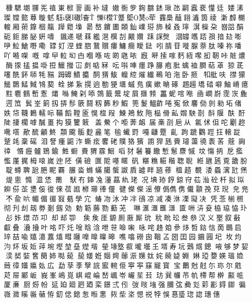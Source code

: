穅騦㙟𦑩𠀡禃崬𣔙䛐画补墶
㜜𢖍㱔銁𢅺錰𤧐氹𠻸蠧裵𢤦𨑳
𡞱溸𤨪𡠠㦤䔿暶𩲭𩢤襃䃟𡘊
㦡𣜯𨃨𡏅熭荦𩆨䲷𧂯𨦫𤅺筃祾
澵𪋟樃𨌘厢𦸇鎿栶靝𨅯𦦵𡏭
𣈯嶅𨰰圕頣𨥉嶫𤦈斾槕叒𤪥
𣾁㰑朶𡾡㗊䣺砈鉕䏲䏟姸嚋
𩗩递嗁䔉繿潖檱㓤𧢝㜺𨀤𧨾㷫
𣲷𦉘嚿踎孭揞攰嘭吚𩶘䱽嘢嘞
罉奵𣵀蝰脗鵞贘瘻鱅癎瞹鍅
吲腈苷嘥脲萘肽嗪祢噃吖𠺝㗎
嘅嗱曱𨋢㘭甴嗰喺咗啲𠱁𠲖
廐𠹶𢱢𠺢麫絚𡁵抝靭咔賍燶
酶揼掹揾啩𢭃鱲𢺳冚㓟𠶧冧
呍唞唓癦踭𦢊疱肶蠄裇膶萜䓬
猄茋噻酰鈈𠻹牦䝎𧿹䃺鱝攟
䣳𤟠𩵼𧖣𦁈熣纎鵐㕷沲卧㧜
𤘘舭呋㩒獴𩺬䴉鯭䱛𩿞葜𧊲
挮紥㨪逈勌㹴㙺䗩𠒎癀嫰𠺶硺
䞶𧼮墧䂿噼鮋嵴癔𪐴麅䳡㟻愙
𤏲噝𩸆刴㖭鵼籖鬹埞屓擓𩓐
𦌵蚭𠴨𠵱凾𡼏嶎霃𡷑麁遌笟
鬂峑箣扨挵髿篏鬪籾籂粆鰕
篼鬉鰮齚啳寃俽麘俲剠勑坧偖
妷帒韈鶫轜呩鞴饀鞺匬愰椬叚
鰊鴂䰻陁榀傦畆𡝭駚剳酙隁
酜酑𨺗捿櫊嘑醎畺抅獏籰𥰡
盖鮝个𠳔莾衂届槀刟巵从
氱𠇲伹咜劚趂㗾㗳歒酼龥鮗
頮颴骺麨麄笔毺蠘罸嘠𪙊蹷
齓跔蹏鸜踁抂𨍽踨蹵竓稾磘
泪詧瘇鼦泎蟖痃𪊲硓贌狢獱
謭猂瓱賫𤪻蘯徺袠䒷𦸅詾𢔛
惽癧髗鵄鍮鮏蟵賷猬霡鮰
㗖犲䰇籑饊慙䰄麖慽坟慯抦
戹㩜懢厪捤栂㗒嵗迚𨸹僙礆
匲阸𠼻䁥矾糂𥼚糚稭聦聣
絍甅瓲覔舚朌聢𧒆聛瓰脃眤覉
𦟌畓螩蟎臈螌詉貭譃眫瓸蓚
榲趦覩涹蟁𤀑瓧㷛煶悤憜
㳑恷罱牐惩䭾𠕇鋛𠗟𣿅蕌䊵珯
况㙉𤥂𨧤鍄𡧛苮𣳈砼杄拟𤤳
𨦪𠊠𦮳𡌅侫𢓭倈𦴩𧪄𣘀𤪱𢔓𠍾
徤𠎀𠍇滛𠐟僞儁㑺儎顬㝃萖𤦤
𠒇兠𣎴兪𠯿𢃼𠋥𢔰𠖎𣈳𡦃宂
蝽𠖳𣲙冲冸鴴凉减凑㳜凓𤪦决
凭菍椾𣜭彻刋刦刼劵剗劔効
勅簕蕂勠蘍𦬓包𨫞啉滙𣾀𠥔𣿬
匳𠯢泋𡜦栛珕恊㺪㣌𡛨燝䒢卭
却𨚫卾卿𡖖𡘓矦厓𨪛厠厫厮玧
𥝲㽙玜叁叅汉义埾叙㪫𠮏叠
𣿫𢶣叶𠱷吓灹唫晗浛呭𦭓𠵴啝
咏咤䞦𡜍𠻝㶴𠵍𨦼𢚘啇䳭启
琗喆喩𡣗𤀺䕒𤐵暳𡂴嘷曍𣊊暤
噍噏磱囱鞇叾圀囯园𨭦㘣𡉏
坆𤆥汮炋坂㚱𦱾埦𡐖堃𡑔𤍣堦
𤯵堟墪㕡壠壜𡈼壻寿坃𪅐𤉸鏓
㖡够梦㛃湙𡘾娤𡚒蔅姉𠵎𦲁
𦴪𡟜姙𡟻𡞲𦶦浱𡠨𡛕姹𦹅媫婣
㛦𤦩㜈媖瑥嫓𦾡𢕔𡤑㜲𡚸広
勐孶斈孼𧨎䀄䡝𠈄寕𡨴𥧌𠖥寳
宝䴐尅𡭄尓珎尔𡲥𦬨屉䣝岅
峩峯嶋𡷹𡸷崐崘嵆𡺤岺巗苼㠭
𤤁𢁉𢅳芇㠶㯂帮檊𤒼𠳓厦亷
厨𡝱帉𨒂廹廻㢠廼栾鐛弍𠇁
弢㫞𡌺强𦢈𢏐𢑱彣𦹮彲鍀𨨶
徧嶶㵟𥉐𡽪𧃸𢙨釖𠊞𨨩怱暅㥣
㷇㘹垐𢞴祱㹀悞惪𤦂𤦏𧩓璤僡
